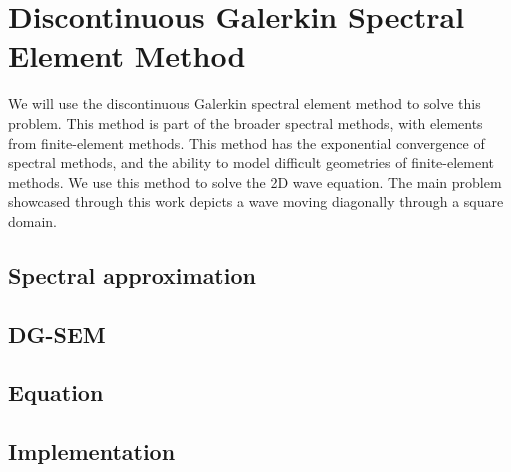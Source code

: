 \chapter{Discontinuous Galerkin Spectral Element Method} \label{chapter:spectral_element_method} 

We will use the discontinuous Galerkin spectral element method to solve this problem. This method is
part of the broader spectral methods, with elements from finite-element methods. This method has the
exponential convergence of spectral methods, and the ability to model difficult geometries of
finite-element methods. We use this method to solve the 2D wave equation. The main problem showcased
through this work depicts a wave moving diagonally through a square domain.

\section{Spectral approximation} \label{section:spectral_element_method:spectral_approximation}

\section{DG-SEM} \label{section:spectral_element_method:dg_sem}

\section{Equation} \label{section:spectral_element_method:equation}

\section{Implementation} \label{section:spectral_element_method:implementation}
